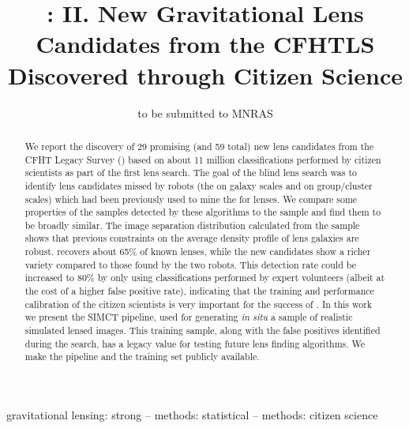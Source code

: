 \documentclass[useAMS,usenatbib,a4paper]{mn2e}
\title[New Gravitational Lens Candidates from CFHTLS]
{\SW: II. New Gravitational Lens Candidates from the CFHTLS Discovered
through Citizen Science}
\author[More et al.]{%
 
}
\begin{document}
\date{to be submitted to MNRAS}
\pagerange{\pageref{firstpage}--\pageref{lastpage}}

\maketitle

\label{firstpage}



\begin{abstract}
We report the discovery of 29 promising (and 59 total) new lens
candidates from the CFHT Legacy Survey (\cfhtls) based on about 11
million classifications performed by citizen scientists as part of the
first \sw lens search.  The goal of the blind lens search was to
identify lens candidates missed by robots (the \rf on galaxy scales and
\af on group/cluster scales) which had been previously used to mine the
\cfhtls for lenses.  We compare some properties of the samples detected
by these algorithms to the \sw sample and find them to be broadly
similar.  The image separation distribution calculated from the \sw
sample shows that previous constraints on the average density profile of
lens galaxies are robust. \sw recovers about 65\% of known lenses, while
the new candidates show a richer variety compared to those found by the
two robots. This detection rate could be increased to 80\% by only using
classifications performed by expert volunteers (albeit at the cost of a
higher false positive rate), indicating that the training and
performance calibration of the citizen scientists is very important for
the success of \sw. In this work we present the SIMCT pipeline, used for
generating {\it in situ} a sample of realistic  simulated lensed images.
This training sample, along with the false positives identified during
the search, has a legacy value for testing future lens finding
algorithms. We make the pipeline and the training set publicly
available.
\end{abstract}

\begin{keywords}
  gravitational lensing: strong   --
  methods: statistical            --
  methods: citizen science
\end{keywords}

\setcounter{footnote}{1}

\end{document}
